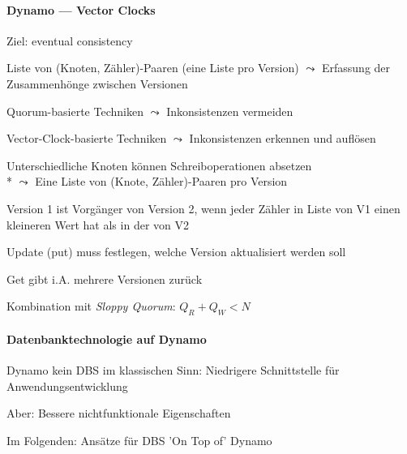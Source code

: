 \paragraph{Dynamo --- Vector Clocks}
\begin{items}
	\item Ziel: eventual consistency
	\item Liste von (Knoten, Zähler)-Paaren (eine Liste pro Version) \( \leadsto \) Erfassung der Zusammenhönge zwischen Versionen
	\item Quorum-basierte Techniken \( \leadsto \) Inkonsistenzen vermeiden
	\item Vector-Clock-basierte Techniken \( \leadsto \) Inkonsistenzen erkennen und auflösen
	\item Unterschiedliche Knoten können Schreiboperationen absetzen \\* \( \leadsto \) Eine Liste von (Knote, Zähler)-Paaren pro Version
	\item Version 1 ist Vorgänger von Version 2, wenn jeder Zähler in Liste von V1 einen kleineren Wert hat als in der von V2
	\item Update (put) muss festlegen, welche Version aktualisiert werden soll
	\item Get gibt i.A. mehrere Versionen zurück
	\item Kombination mit \emph{Sloppy Quorum}: \( Q_R+Q_W < N \)
\end{items}



\paragraph{Datenbanktechnologie auf Dynamo}
\begin{items}
	\item Dynamo kein DBS im klassischen Sinn: Niedrigere Schnittstelle für Anwendungsentwicklung
	\item Aber: Bessere nichtfunktionale Eigenschaften
	\item Im Folgenden: Ansätze für DBS 'On Top of' Dynamo
\end{items}

